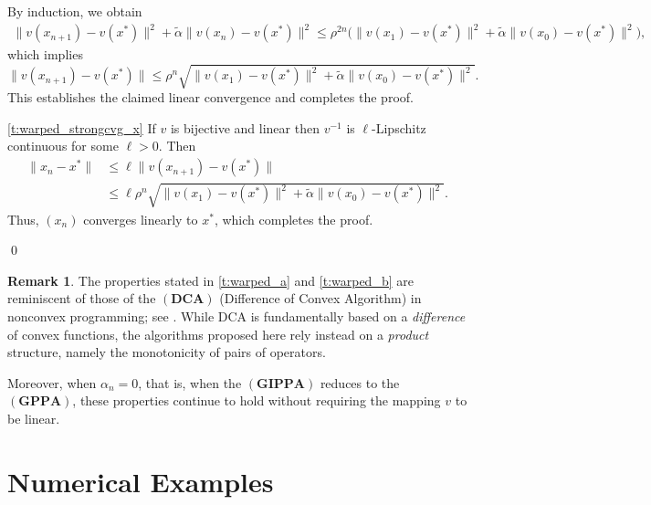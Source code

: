 \documentclass[11pt]{article}
\makeatletter
\renewenvironment{proof}[1][\proofname]{\par
	\normalfont
	\topsep0\p@\@plus3\p@ \trivlist
	\item[\hskip\labelsep\itshape
	#1\@addpunct{.}]\ignorespaces
}{%
	\qed\endtrivlist
}
\theoremstyle{definition}
\theoremstyle{definition}
\theoremstyle{definition}
\newtheorem{remark}[theorem]{Remark}
\newcommand{\tcr}{\textcolor{red}}
\def\tcr{ \textcolor{red}}
\makeatother
\begin{document}
\begin{proof}
{By induction, we obtain
\begin{align*}
\|v(x_{n+1})-v(x^*)\|^2
+ \tilde{\alpha}\|v(x_n)-v(x^*)\|^2
\le \rho^{2n}\bigl(\|v(x_1)-v(x^*)\|^2
+ \tilde{\alpha}\|v(x_0)-v(x^*)\|^2\bigr),
\end{align*}
which implies
\[
\|v(x_{n+1})-v(x^*)\|
\le \rho^n
\sqrt{\|v(x_1)-v(x^*)\|^2
+ \tilde{\alpha}\|v(x_0)-v(x^*)\|^2}.
\]
This establishes the claimed linear convergence and completes the proof.
}


\medskip
\ref{t:warped_strongcvg_x}
If $v$ is bijective and linear then $v^{-1}$ is  $\ell$-Lipschitz continuous for some $\ell>0$. Then
\begin{align*}
\|x_n - x^*\| 
&\leq \ell \|v(x_{n+1}) - v(x^*)\| \\
&\leq \ell \rho^n \sqrt{\|v(x_1)-v(x^*)\|^2+\tilde{\alpha}\|v(x_{0})-v(x^*)\|^2}.
\end{align*}
Thus, $(x_n)$ converges linearly to $x^*$, which completes the proof.  

\end{proof}

\begin{remark}
{The properties stated in \ref{t:warped_a} and \ref{t:warped_b} are reminiscent of those of the \(\mathbf{(DCA)}\) (Difference of Convex Algorithm) in nonconvex programming; see \cite{Pham}. While DCA is fundamentally based on a \emph{difference} of convex functions, the algorithms proposed here rely instead on a \emph{product} structure, namely the monotonicity of pairs of operators. }

{Moreover, when \(\alpha_n=0\), that is, when the \(\mathbf{(GIPPA)}\) reduces to the \(\mathbf{(GPPA)}\), these properties continue to hold without requiring the mapping \(v\) to be linear.
}
\end{remark}



\section{Numerical Examples}
\end{document}
